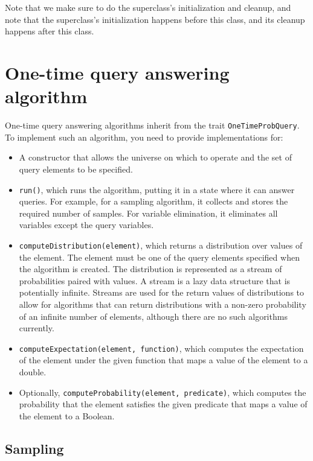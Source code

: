 Note that we make sure to do the superclass's initialization and cleanup, and note that the superclass's initialization happens before this class, and its cleanup happens after this class.


\section{One-time query answering algorithm}

One-time query answering algorithms inherit from the trait \texttt{OneTimeProb\-Query}. To implement such an algorithm, you need to provide implementations for:

\begin{itemize}
\item A constructor that allows the universe on which to operate and the set of query elements to be specified.
\item \texttt{run()}, which runs the algorithm, putting it in a state where it can answer queries. For example, for a sampling algorithm, it collects and stores the required number of samples. For variable elimination, it eliminates all variables except the query variables.
\item \texttt{computeDistribution(element)}, which returns a distribution over values of the element. The element must be one of the query elements specified when the algorithm is created. The distribution is represented as a stream of probabilities paired with values. A stream is a lazy data structure that is potentially infinite. Streams are used for the return values of distributions to allow for algorithms that can return distributions with a non-zero probability of an infinite number of elements, although there are no such algorithms currently.
\item \texttt{computeExpectation(element, function)}, which computes the expectation of the element under the given function that maps a value of the element to a double.
\item Optionally, \texttt{computeProbability(element, predicate)}, which computes the probability that the element satisfies the given predicate that maps a value of the element to a Boolean.
\end{itemize}

\subsection{Sampling}

